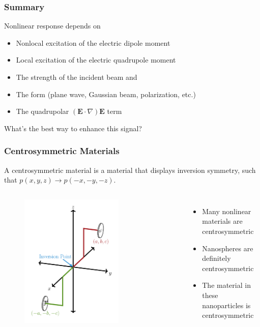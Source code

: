 \documentclass{beamer}
\begin{document}
\begin{frame}
\frametitle{Summary}
\begin{block}{Nonlinear response depends on}
\begin{itemize}
\item Nonlocal excitation of the electric dipole moment 
\item Local excitation of the electric quadrupole moment
\item The strength of the incident beam and
\item The form (plane wave, Gaussian beam, polarization, etc.)
\item The quadrupolar $\left(\mathbf{E}\cdot\nabla\right)\mathbf{E}$ term
\end{itemize}
\end{block}
What's the best way to enhance this signal?
\end{frame}

\begin{frame}
\frametitle{Centrosymmetric Materials}
A centrosymmetric material is a material that displays inversion symmetry, such
that $p(x,y,z) \rightarrow p(-x,-y,-z)$.
\begin{columns}
\begin{figure}
\centering
\includegraphics[width=0.7\textwidth]{diag-centrosymmetry}
\end{figure}
\begin{itemize}
\item Many nonlinear materials are centrosymmetric
\item Nanospheres are definitely centrosymmetric
\item The material in these nanoparticles is centrosymmetric
\end{itemize}
\end{columns}
\end{frame}
\end{document}

